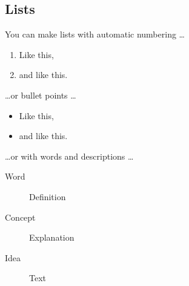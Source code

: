 \documentclass[fleqn,10pt]{olplainarticle}
\begin{document}
\subsection*{Lists}

You can make lists with automatic numbering \dots

\begin{enumerate}[noitemsep] 
\item Like this,
\item and like this.
\end{enumerate}
\dots or bullet points \dots
\begin{itemize}[noitemsep] 
\item Like this,
\item and like this.
\end{itemize}
\dots or with words and descriptions \dots
\begin{description}
\item[Word] Definition
\item[Concept] Explanation
\item[Idea] Text
\end{description}




\end{document}
